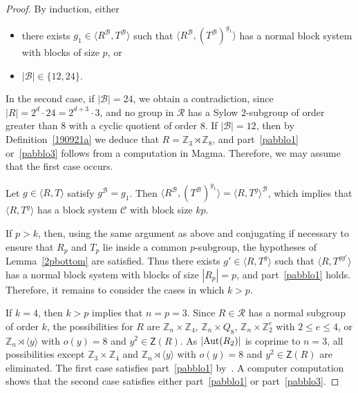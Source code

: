 \documentclass[11pt]{amsart}
\numberwithin{equation}{section}
\theoremstyle{definition}
\newcounter{case}
\def\Aut{{\rm Aut}}
\def\Z{{\mathbb Z}}
\begin{document}
\begin{proof}
		By induction, either
		\begin{itemize}
			\item there exists $g_1 \in \langle R^{\mathcal B}, T^{\mathcal B} \rangle$ such that  
			$\langle R^{\mathcal B}, (T^{\mathcal B})^{g_1} \rangle$ has a normal block system with blocks of size $p$, or
			\item $|\mathcal{B}| \in \{12,24\}$.
		\end{itemize}
		In the second case, if $|\mathcal{B}| = 24$, we obtain a contradiction, since  
		$|R| = 2^{d} \cdot 24 = 2^{d+3} \cdot 3$,
		and no group in ${\mathcal R}$ has a Sylow $2$-subgroup of order greater than $8$ with a cyclic quotient of order $8$.  
		If $|\mathcal{B}| = 12$, then by Definition~\ref{190921a} we deduce that $R =\mathbb{Z}_3\rtimes\mathbb{Z}_8$, and part~\eqref{pabblo1} or~\eqref{pabblo3} follows from a computation in Magma.  
		Therefore, we may assume that the first case occurs.
		
		Let $g \in \langle R, T\rangle$ satisfy $g^{\mathcal B} = g_1$.  
		Then $
		\langle R^{\mathcal B}, (T^{\mathcal B})^{g_1} \rangle 
		= \langle R, T^{g} \rangle^{\mathcal B}$,
		which implies that $\langle R, T^{g} \rangle$ has a block system ${\mathcal C}$ with block size $kp$.
		
		If $p > k$, then, using the same argument as above and conjugating if necessary to ensure that  
		$R_p$ and $T_p$ lie inside a common $p$-subgroup, the hypotheses of Lemma~\ref{2pbottom} are satisfied.  
		Thus there exists $g' \in \langle R, T^g\rangle$ such that  
		$\langle R, T^{gg'} \rangle$ has a normal block system with blocks of size $|R_p| = p$, and part~\eqref{pabblo1} holds.  
		Therefore, it remains to consider the cases in which $k > p$.
		
		If $k = 4$, then $k > p$ implies that $n = p = 3$.  
		Since $R \in {\mathcal R}$ has a normal subgroup of order $k$, the possibilities for $R$ are  
		$\Z_{n} \times \Z_{4}$, $\Z_{n} \times Q_{8}$, $\Z_{n} \times \Z_{2}^{e}$ with $2 \le e \le 4$,  
		or $\Z_{n} \rtimes \langle y \rangle$ with $o(y) = 8$ and $y^{2} \in \mathsf{Z}(R)$.  
		As $|\Aut(R_{2})|$ is coprime to $n = 3$, all possibilities except  
		$\Z_{3} \times \Z_{4}$ and $\Z_{n} \rtimes \langle y \rangle$ with $o(y) = 8$ and  
		$y^{2} \in \mathsf{Z}(R)$ are eliminated.  
		The first case satisfies part~\eqref{pabblo1} by~\cite[Theorem~4.9]{Muzychuk1999}.  
		A computer computation shows that the second case satisfies either part~\eqref{pabblo1} or part~\eqref{pabblo3}.
		

\end{proof}
\end{document}
